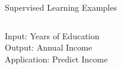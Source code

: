 \documentclass[8pt,aspectratio=169]{beamer}
\begin{document}

\begin{frame}{Supervised Learning Examples}

\pause
\begin{columns}[T]
\begin{column}{.33\textwidth}
\begin{center}
  \vspace{-1mm}

  Input: Years of Education\\
  Output: Annual Income\\
  Application: Predict Income
\end{center}
\end{column}

\pause
\begin{column}{.33\textwidth}
\begin{center}
  \vspace{2mm}


\end{center}
\end{column}
\end{columns}
\end{frame}
\end{document}
